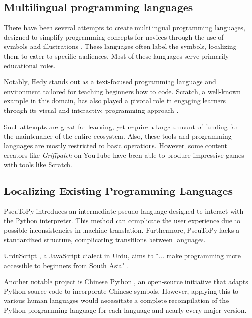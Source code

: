 \documentclass[conference]{IEEEtran}
\begin{document}
\subsection{Multilingual programming languages}

There have been several attempts to create multilingual programming languages, designed to simplify programming concepts for novices through the use of symbols and illustrations \cite{suleiman1995visual}. These languages often label the symbols, localizing them to cater to specific audiences. Most of these languages serve primarily educational roles.

Notably, Hedy \cite{Hermans_Hedy_A_Gradual} stands out as a text-focused programming language and environment tailored for teaching beginners how to code. Scratch, a well-known example in this domain, has also played a pivotal role in engaging learners through its visual and interactive programming approach \cite{resnick2009scratch}.

Such attempts are great for learning, yet require a large amount of funding for the maintenance of the entire ecosystem. Also, these tools and programming languages are mostly restricted to basic operations. However, some content creators like \textit{Griffpatch} on YouTube \cite{freitasfilho2022scratch} have been able to produce impressive games with tools like Scratch.

\subsection{Localizing Existing Programming Languages}

PseuToPy \cite{wang2021pseutopy} introduces an intermediate pseudo language designed to interact with the Python interpreter. This method can complicate the user experience due to possible inconsistencies in machine translation. Furthermore, PseuToPy lacks a standardized structure, complicating transitions between languages.

UrduScript \cite{Memon_UrduScript_2019}, a JavaScript dialect in Urdu, aims to "... make programming more accessible to beginners from South Asia" \cite{Urdu_Mein_Programming}.

Another notable project is Chinese Python \cite{Glace_ChinesePython_2002}, an open-source initiative that adapts Python source code to incorporate Chinese symbols. However, applying this to various human languages would necessitate a complete recompilation of the Python programming language for each language and nearly every major version.
\end{document}
